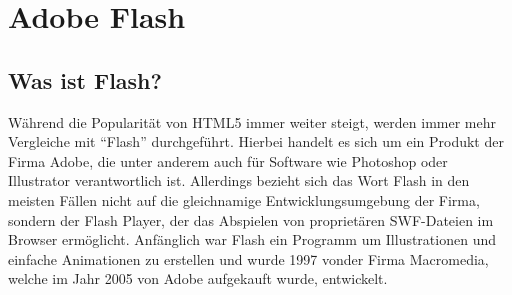 \chapter{Adobe Flash}

\section{Was ist Flash?}
Während die Popularität von HTML5 immer weiter steigt, werden immer mehr Vergleiche
mit "`Flash"' durchgeführt. Hierbei handelt es sich um ein Produkt der Firma Adobe, die 
unter anderem auch für Software wie Photoshop oder Illustrator verantwortlich ist. Allerdings
bezieht sich das Wort Flash in den meisten Fällen nicht auf die gleichnamige 
Entwicklungsumgebung der Firma, sondern der Flash Player, der das Abspielen von 
proprietären SWF-Dateien im Browser ermöglicht. Anfänglich war Flash ein
Programm um Illustrationen und einfache Animationen zu erstellen und wurde
1997 vonder Firma Macromedia, welche im Jahr 2005 von Adobe aufgekauft wurde,
entwickelt.


